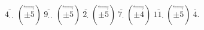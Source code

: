 \documentclass[preview]{standalone}
\begin{document}
\begin{center}
$\overline{4_{\cdot\cdot}} \ (\stackrel{\leftrightharpoons}{\pm5}) \ \overline{9_{\cdot\cdot}} \ (\stackrel{\leftrightharpoons}{\pm5}) \ \overline{2_\cdot} \ (\stackrel{\leftrightharpoons}{\pm5}) \ \overline{7_\cdot} \ (\stackrel{\leftrightharpoons}{\pm4}) \ \overline{11_\cdot} \ (\stackrel{\leftrightharpoons}{\pm5}) \ \overline{4}$.
\end{center}
\end{document}
